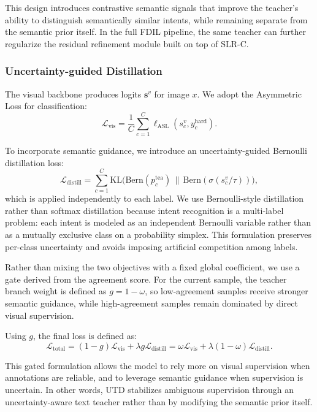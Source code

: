 This design introduces contrastive semantic signals that improve the teacher's ability to distinguish semantically similar intents, while remaining separate from the semantic prior itself. In the full FDIL pipeline, the same teacher can further regularize the residual refinement module built on top of SLR-C.

\subsubsection{Uncertainty-guided Distillation}

The visual backbone produces logits $\mathbf{s}^{v}$ for image $x$. We adopt the Asymmetric Loss \cite{ridnik_asymmetric_2021} for classification:
\begin{equation}
\mathcal{L}_{\text{vis}} = \frac{1}{C} \sum_{c=1}^{C} \ell_{\text{ASL}}(s^{v}_{c}, y^{\text{hard}}_{c}).
\end{equation}

To incorporate semantic guidance, we introduce an uncertainty-guided Bernoulli distillation loss:
\begin{equation}
\mathcal{L}_{\text{distill}} = \sum_{c=1}^{C}\text{KL}\big(\mathrm{Bern}(p_c^{\text{tea}})\,\|\, \mathrm{Bern}(\sigma(s_c^{v}/\tau))\big),
\end{equation}
which is applied independently to each label. We use Bernoulli-style distillation rather than softmax distillation because intent recognition is a multi-label problem: each intent is modeled as an independent Bernoulli variable rather than as a mutually exclusive class on a probability simplex. This formulation preserves per-class uncertainty and avoids imposing artificial competition among labels.

Rather than mixing the two objectives with a fixed global coefficient, we use a gate derived from the agreement score. For the current sample, the teacher branch weight is defined as $g = 1 - \omega$, so low-agreement samples receive stronger semantic guidance, while high-agreement samples remain dominated by direct visual supervision.

Using $g$, the final loss is defined as:
\begin{equation}
\mathcal{L}_{\text{total}} = (1-g)\mathcal{L}_{\text{vis}} + \lambda g \mathcal{L}_{\text{distill}}
= \omega \mathcal{L}_{\text{vis}} + \lambda (1-\omega)\mathcal{L}_{\text{distill}}.
\end{equation}

This gated formulation allows the model to rely more on visual supervision when annotations are reliable, and to leverage semantic guidance when supervision is uncertain. In other words, UTD stabilizes ambiguous supervision through an uncertainty-aware text teacher rather than by modifying the semantic prior itself.

